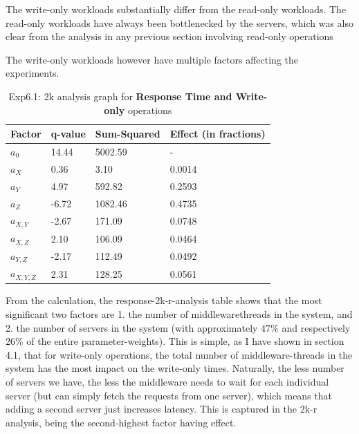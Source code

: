 \documentclass[11pt,a4paper]{article}
\begin{document}
The write-only workloads substantially differ from the read-only workloads.
The read-only workloads have always been bottlenecked by the servers, which was also clear from the analysis in any previous section involving read-only operations

The write-only workloads however have multiple factors affecting the experiments.

\begin{center}
	\begin{table}[H]
	\center
    \begin{tabular}{ | l | l | l | l |  }
    \hline
    Factor & q-value & Sum-Squared & Effect (in fractions) \\ \hline
    $a_0$ & 14.44 & 5002.59 & - \\ \hline
    $a_X$ & 0.36 & 3.10 & 0.0014 \\ \hline
    $a_Y$ & 4.97 & 592.82 & 0.2593 \\ \hline
    $a_Z$ & -6.72  & 1082.46 & 0.4735 \\ \hline
   	$a_{X, Y}$ & -2.67 & 171.09 & 0.0748	 \\ \hline
    $a_{X, Z}$ & 2.10 & 106.09	 & 0.0464	 \\ \hline
    $a_{Y, Z}$ & -2.17 & 112.49 & 0.0492	 \\ \hline
    $a_{X, Y, Z}$ & 2.31 & 128.25 & 0.0561 \\
    \hline
    \end{tabular}
  	\caption{Exp6.1: 2k analysis graph for \textbf{Response Time and Write-only} operations}	 
  	\end{table}  
\end{center}

From the calculation, the response-2k-r-analysis table shows that the most significant two factors are 1. the number of middlewarethreads in the system, and 2. the number of servers in the system (with approximately $ 47 \% $ and respectively $ 26 \% $ of the entire parameter-weights).
This is simple, as I have shown in section 4.1, that for write-only operations, the total number of middleware-threads in the system has the most impact on the write-only times.
Naturally, the less number of servers we have, the less the middleware needs to wait for each individual server (but can simply fetch the requests from one server), which means that adding a second server just increases latency.
This is captured in the 2k-r analysis, being the second-highest factor having effect.
\end{document}
